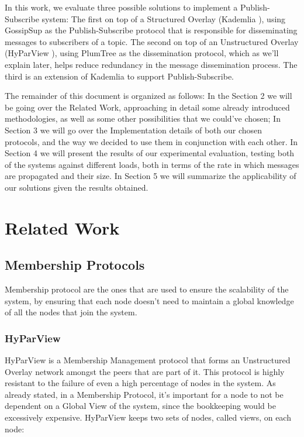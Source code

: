 \documentclass[sigconf]{acmart}
\begin{document}
In this work, we evaluate three possible solutions to implement a Publish-Subscribe system: The first on top of a Structured Overlay (Kademlia \cite{maymounkov2002kademlia}), using GossipSup \cite{vyzovitis2020gossipsub} as the Publish-Subscribe protocol that is responsible for disseminating messages to subscribers of a topic.
The second on top of an Unstructured Overlay (HyParView \cite{leitao2007epidemic}), using PlumTree \cite{leitao2007epidemic} as the dissemination protocol, which as we'll explain later, helps reduce redundancy in the message dissemination process.
The third is an extension of Kademlia to support Publish-Subscribe.

The remainder of this document is organized as follows:
In the Section 2 we will be going over the Related Work, approaching in detail some already introduced methodologies, as well as some other possibilities that we could've chosen; In Section 3 we will go over the Implementation details of both our chosen protocols, and the way we decided to use them in conjunction with each other. In Section 4 we will present the results of our experimental evaluation, testing both of the systems against different loads, both in terms of the rate in which messages are propagated and their size. In Section 5 we will summarize the applicability of our solutions given the results obtained.

\section{Related Work}

\subsection{Membership Protocols}

Membership protocol are the ones that are used to ensure the scalability of the system, by ensuring that each node doesn't need to maintain a global knowledge of all the nodes that join the system.

\subsubsection{HyParView}

HyParView is a Membership Management protocol that forms an Unstructured Overlay network amongst the peers that are part of it. 
This protocol is highly resistant to the failure of even a high percentage of nodes in the system. As already stated, in a Membership Protocol, it's important for a node to not be dependent on a Global View of the system, since the bookkeeping would be excessively expensive. HyParView keeps two sets of nodes, called views, on each node: 
\end{document}
